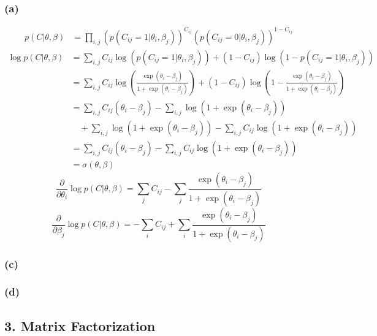 \documentclass[12pt]{article}
\begin{document}
\subsubsection*{(a)}
\begin{align*}
p(C|\theta,\beta) &= \prod_{i,j} \left( p(C_{ij}=1|\theta_i,\beta_j) \right)^{C_{ij}} \left(p(C_{ij}=0|\theta_i,\beta_j) \right)^{1 - C_{ij}}
\end{align*}
\begin{align*}
\log p(C|\theta,\beta) &= \sum_{i,j} C_{ij} \log \left( p(C_{ij}=1|\theta_i,\beta_j) \right) + (1 - C_{ij}) \log \left( 1 - p(C_{ij}=1|\theta_i,\beta_j) \right) \\
&= \sum_{i,j} C_{ij} \log \left( \frac{\exp(\theta_i - \beta_j)}{1 + \exp(\theta_i - \beta_j)} \right) + (1 - C_{ij}) \log \left( 1 - \frac{\exp(\theta_i - \beta_j)}{1 + \exp(\theta_i - \beta_j)} \right) \\
&= \sum_{i,j} C_{ij} (\theta_i - \beta_j) - \sum_{i,j} \log(1 + \exp(\theta_i - \beta_j)) \\
&\quad + \sum_{i,j} \log(1 + \exp(\theta_i - \beta_j)) - \sum_{i,j} C_{ij} \log(1 + \exp(\theta_i - \beta_j)) \\
&= \sum_{i,j} C_{ij} (\theta_i - \beta_j) - \sum_{i,j} C_{ij} \log(1 + \exp(\theta_i - \beta_j))\\
&=\sigma(\theta, \beta)
\end{align*}
$$\frac{\partial}{\partial \theta_i} \log p(C|\theta,\beta) = \sum_{j} C_{ij} - \sum_{j} \frac{\exp(\theta_i - \beta_j)}{1 + \exp(\theta_i - \beta_j)}$$
$$\frac{\partial}{\partial \beta_j} \log p(C|\theta,\beta) = - \sum_{i} C_{ij} + \sum_{i} \frac{\exp(\theta_i - \beta_j)}{1 + \exp(\theta_i - \beta_j)}
$$
\subsubsection*{(c)}


\subsubsection*{(d)}


\newpage
\subsection*{3. Matrix Factorization}
\end{document}
